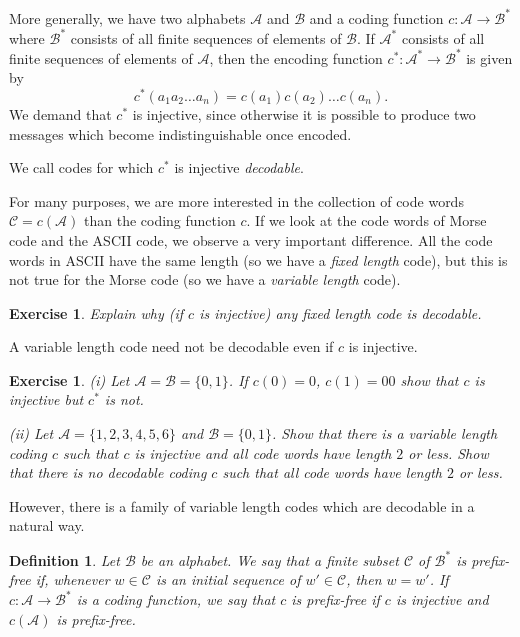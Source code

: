\documentclass[12pt,a4paper]{article}
\theoremstyle{plain}
\newtheorem{definition}[theorem]{Definition}
\newtheorem{exercise}[theorem]{Exercise}
\theoremstyle{definition}
\begin{document}
    More generally, we have two alphabets ${\mathcal A}$
    and ${\mathcal B}$
    and a coding function $c:{\mathcal A}\rightarrow{\mathcal B}^{*}$
    where ${\mathcal B}^{*}$ consists of all finite sequences of
    elements of  ${\mathcal B}$.
    If  ${\mathcal A}^{*}$ consists of all finite sequences
    of elements of  ${\mathcal A}$,
    then the encoding function
    $c^{*}:{\mathcal A}^{*}\rightarrow{\mathcal B}^{*}$
    is given by
    \[c^{*}(a_{1}a_{2}\ldots a_{n})=c(a_{1})c(a_{2})\dots c(a_{n}).\]
    We demand that $c^{*}$ is injective, since otherwise
    it is possible to produce two
    messages which become indistinguishable once encoded.

    We call codes for which $c^{*}$ is injective \emph{decodable}.

    For many purposes, we are more interested
    in the collection of code words ${\mathcal C}=c({\mathcal A})$
    than the coding function $c$. If we look
    at the code words of Morse code and the ASCII code, we
    observe a very important difference.
    All the code words in ASCII have the same length
    (so we have a \emph{fixed length} code),
    but this is not true for the Morse code
    (so we have a \emph{variable length} code).
    \begin{exercise}
        \label{E;fix length} Explain why (if $c$ is injective)
        any fixed length code
        is decodable.
    \end{exercise}

    A variable length code need not be decodable even
    if $c$ is injective.
    \begin{exercise}
        \label{E;decodable}
        (i) Let ${\mathcal A}={\mathcal B}=\{0,1\}$. If
        $c(0)=0$, $c(1)=00$ show that $c$ is injective but $c^{*}$ is not.

        (ii) Let ${\mathcal A}=\{1,2,3,4,5,6\}$ and ${\mathcal B}=\{0,1\}$.
        Show that there is a variable length coding $c$ such that
        $c$ is injective and all code words have length $2$ or less.
        Show that there is no decodable coding $c$ such that
        all code words have length $2$ or less.
    \end{exercise}

    However, there is a family of variable length codes
    which are decodable in a natural way.
    \begin{definition}
        Let ${\mathcal B}$ be an alphabet. We say that
        a finite subset ${\mathcal C}$ of ${\mathcal B}^{*}$
        is \emph{prefix-free} if,
        whenever $w\in{\mathcal C}$ is an initial sequence
        of $w'\in{\mathcal C}$, then $w=w'$.
        If $c:{\mathcal A}\rightarrow{\mathcal B}^{*}$
        is a coding function, we say that $c$ is prefix-free if $c$ is injective
        and $c({\mathcal A})$
        is prefix-free.
    \end{definition}
\end{document}
